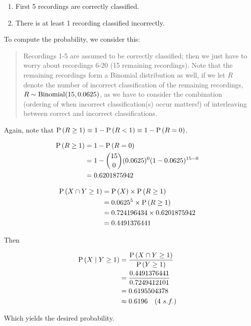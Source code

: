 \begin{enumerate}
    \item First 5 recordings are correctly classified.
    \item There is at least 1 recording classified incorrectly.
\end{enumerate}

To compute the probability, we consider this:

\begin{quote}
    Recordings 1-5 are assumed to be correctly classified; then we just have to worry about recordings 6-20 (15 remaining recordings). Note that the remaining recordings form a Binomial distribution as well, if we let $R$ denote the number of incorrect classification of the remaining recordings, $R \sim \mathrm{Binomial}(15, 0.0625)$, as we have to consider the combination (ordering of when incorrect classification(s) occur matters!) of interleaving between correct and incorrect classifications.
\end{quote}

Again, note that $\mathrm{P} \left( R \ge 1 \right) \equiv 1 - \mathrm{P} \left( R < 1 \right) \equiv 1 - \mathrm{P} \left( R = 0 \right)$.

\begin{align}
    \mathrm{P} \left( R \ge 1 \right)
    &= 1 - \mathrm{P} \left( R = 0 \right) \\
    &= 1 - \binom{15}{0} (0.0625)^{0} (1-0.0625)^{15-0} \\
    &= 0.6201875942
\end{align}

\begin{align}
    \mathrm{P} \left( X \cap Y \ge 1 \right)
    &= \mathrm{P} \left( X \right) \times \mathrm{P} \left( R \ge 1 \right) \\
    &= 0.0625^5 \times \mathrm{P} \left( R \ge 1 \right) \\
    &= 0.724196434 \times 0.6201875942 \\
    &= 0.4491376441
\end{align}

Then

\begin{align}
    \mathrm{P} \left( X \mid Y \ge 1 \right)
    &= \frac{ \mathrm{P} \left( X \cap Y \ge 1 \right) }{ \mathrm{P} \left( Y \ge 1 \right) } \\
    &= \frac{ 0.4491376441 }{ 0.7249412101 } \\
    &= 0.6195504378 \\
    &\approx 0.6196 \quad (4\ s.f.)
\end{align}

Which yields the desired probability.
